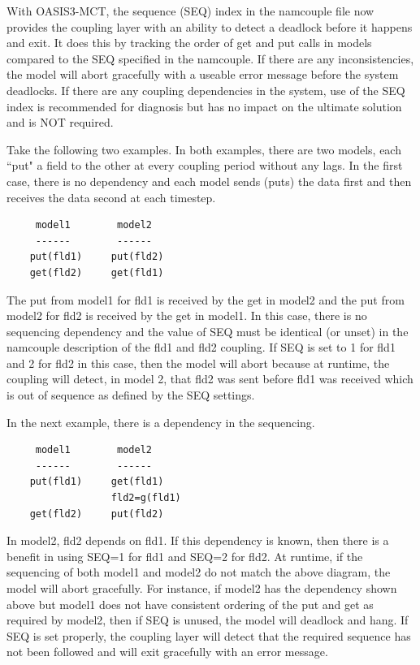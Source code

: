 With OASIS3-MCT, the sequence (SEQ) index in the namcouple file now provides the coupling 
layer with an ability to detect a deadlock before it happens and exit. 
It does this by tracking the order of get and put calls in
models compared to the SEQ specified in the namcouple.  If there are any
inconsistencies, the model will abort gracefully with a useable error
message before the system deadlocks.  If there are any coupling dependencies
in the system, use of the SEQ index is recommended for diagnosis but
has no impact on the ultimate solution and is NOT required.

Take the following two examples.  In both examples, there are two
models, each ``put" a field to the other at every coupling period
without any lags.  In the first case, there is no dependency and 
each model sends (puts) the data first and then receives the data
second at each timestep.

\begin{verbatim}
     model1        model2
     ------        ------
    put(fld1)     put(fld2)
    get(fld2)     get(fld1)
\end{verbatim}

The put from model1 for fld1 is received by the get in model2 and the
put from model2 for fld2 is received by the get in model1.  In this case,
there is no sequencing dependency and the value of SEQ must be
identical (or unset) in the namcouple description of the fld1
and fld2 coupling.  If SEQ is set to 1 for fld1 and 2 for fld2 in this case, then
the model will abort because at runtime, the coupling will detect, in model 2, that 
fld2 was sent before fld1 was received which is out of sequence
as defined by the SEQ settings.

In the next example, there is a dependency in the sequencing.

\begin{verbatim}
     model1        model2
     ------        ------
    put(fld1)     get(fld1)
                  fld2=g(fld1)
    get(fld2)     put(fld2)
\end{verbatim}

In model2, fld2 depends on fld1.  If this dependency is known, then
there is a benefit in using SEQ=1 for fld1 and SEQ=2 for fld2.  At
runtime, if the sequencing of both model1 and model2 do not match
the above diagram, the model will abort gracefully.  For instance,
if model2 has the dependency shown above but model1 does not have
consistent ordering of the put and get as required by model2,
then if SEQ is unused, the model will deadlock and hang.  If SEQ
is set properly, the coupling layer will detect that the required
sequence has not been followed and will exit gracefully with an
error message.  

